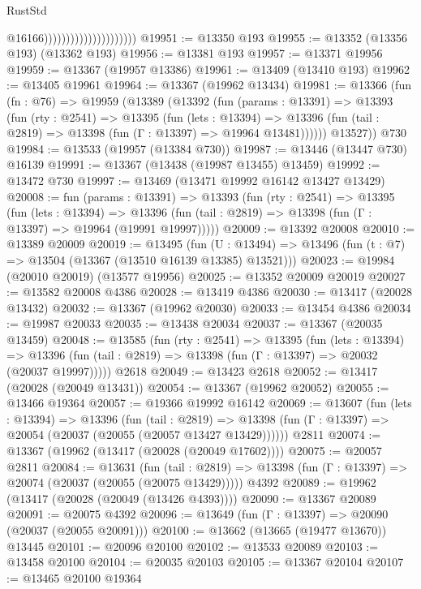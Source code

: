 \begin{lexlean}{RustStd}
\begin{coremodule}
                                              @16166)))))))))))))))))))))
@19951 := @13350 @193
@19955 := @13352 (@13356 @193) (@13362 @193)
@19956 := @13381 @193
@19957 := @13371 @19956
@19959 := @13367 (@19957 @13386)
@19961 := @13409 (@13410 @193)
@19962 := @13405 @19961
@19964 := @13367 (@19962 @13434)
@19981 := @13366
    (fun (fn : @76) =>
    @19959
      (@13389
        (@13392
          (fun (params : @13391) =>
          @13393
            (fun (rty : @2541) =>
            @13395
              (fun (lets : @13394) =>
              @13396 (fun (tail : @2819) => @13398 (fun (Γ : @13397) => @19964 @13481))))))
        @13527))
    @730
@19984 := @13533 (@19957 (@13384 @730))
@19987 := @13446 (@13447 @730) @16139
@19991 := @13367 (@13438 (@19987 @13455) @13459)
@19992 := @13472 @730
@19997 := @13469 (@13471 @19992 @16142 @13427 @13429)
@20008 := fun (params : @13391) =>
  @13393
    (fun (rty : @2541) =>
    @13395
      (fun (lets : @13394) =>
      @13396 (fun (tail : @2819) => @13398 (fun (Γ : @13397) => @19964 (@19991 @19997)))))
@20009 := @13392 @20008
@20010 := @13389 @20009
@20019 := @13495
    (fun (U : @13494) => @13496 (fun (t : @7) => @13504 (@13367 (@13510 @16139 @13385) @13521)))
@20023 := @19984 (@20010 @20019) (@13577 @19956)
@20025 := @13352 @20009 @20019
@20027 := @13582 @20008 @4386
@20028 := @13419 @4386
@20030 := @13417 (@20028 @13432)
@20032 := @13367 (@19962 @20030)
@20033 := @13454 @4386
@20034 := @19987 @20033
@20035 := @13438 @20034
@20037 := @13367 (@20035 @13459)
@20048 := @13585
    (fun (rty : @2541) =>
    @13395
      (fun (lets : @13394) =>
      @13396 (fun (tail : @2819) => @13398 (fun (Γ : @13397) => @20032 (@20037 @19997)))))
    @2618
@20049 := @13423 @2618
@20052 := @13417 (@20028 (@20049 @13431))
@20054 := @13367 (@19962 @20052)
@20055 := @13466 @19364
@20057 := @19366 @19992 @16142
@20069 := @13607
    (fun (lets : @13394) =>
    @13396
      (fun (tail : @2819) =>
      @13398 (fun (Γ : @13397) => @20054 (@20037 (@20055 (@20057 @13427 @13429))))))
    @2811
@20074 := @13367 (@19962 (@13417 (@20028 (@20049 @17602))))
@20075 := @20057 @2811
@20084 := @13631
    (fun (tail : @2819) => @13398 (fun (Γ : @13397) => @20074 (@20037 (@20055 (@20075 @13429)))))
    @4392
@20089 := @19962 (@13417 (@20028 (@20049 (@13426 @4393))))
@20090 := @13367 @20089
@20091 := @20075 @4392
@20096 := @13649 (fun (Γ : @13397) => @20090 (@20037 (@20055 @20091)))
@20100 := @13662 (@13665 (@19477 @13670)) @13445
@20101 := @20096 @20100
@20102 := @13533 @20089
@20103 := @13458 @20100
@20104 := @20035 @20103
@20105 := @13367 @20104
@20107 := @13465 @20100 @19364

\end{coremodule}
\end{lexlean}
